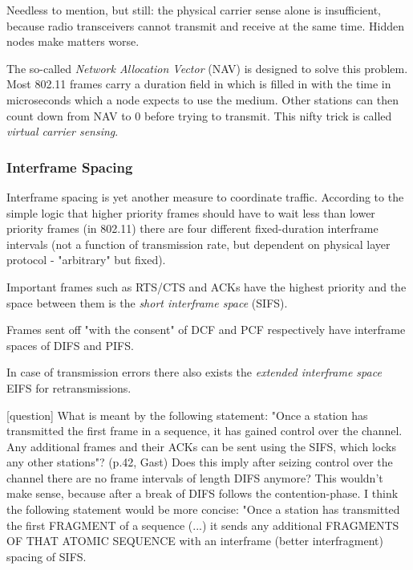 \documentclass{article}
\begin{document}
	Needless to mention, but still: the physical carrier sense alone is insufficient, because radio transceivers cannot transmit and receive at the same time. Hidden nodes make matters worse.
	
	\bigskip
	
	The so-called \emph{Network Allocation Vector} (NAV) is designed to solve this problem. Most 802.11 frames carry a duration field in which is filled in with the time in microseconds which a node expects to use the medium. Other stations can then count down from NAV to 0 before trying to transmit. This nifty trick is called \emph{virtual carrier sensing}.
	
	\subsubsection{Interframe Spacing}
	
	Interframe spacing is yet another measure to coordinate traffic. According to the simple logic that higher priority frames should have to wait less than lower priority frames  (in 802.11) there are four different fixed-duration interframe intervals (not a function of transmission rate, but dependent on physical layer protocol - "arbitrary" but fixed).
	
	\bigskip
	
	Important frames such as RTS/CTS and ACKs have the highest priority and the space between them is the \emph{short interframe space} (SIFS).
	
	\medskip
	
	Frames sent off "with the consent" of DCF and PCF respectively have interframe spaces of DIFS and PIFS.
	
	\medskip
	
	In case of transmission errors there also exists the \emph{extended interframe space} EIFS for retransmissions. 
	
	\bigskip
	
	\color{blue}
	[question] What is meant by the following statement: "Once a station has transmitted the first frame in a sequence, it has gained control over the channel. Any additional frames and their ACKs can be sent using the SIFS, which locks any other stations"? (p.42, Gast) Does this imply after seizing control over the channel there are no frame intervals of length DIFS anymore? This wouldn't make sense, because after a break of DIFS follows the contention-phase. I think the following statement would be more concise: "Once a station has transmitted the first FRAGMENT of a sequence (...) it sends any additional FRAGMENTS OF THAT ATOMIC SEQUENCE with an interframe (better interfragment) spacing of SIFS.
	\color{black}
	 
\end{document}
